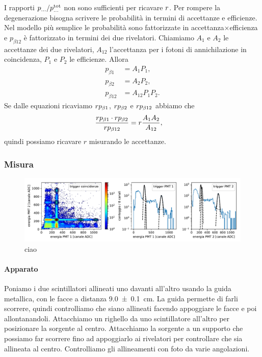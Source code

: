 I rapporti $p_{\dots} / p_{\dots}^\text{tot}$ non sono sufficienti per ricavare $r$.
Per rompere la degenerazione bisogna scrivere le probabilità in termini di accettanze e efficienze.
Nel modello più semplice le probabilità sono fattorizzate in accettanza$\times$efficienza
e $p_{\beta12}$ è fattorizzato in termini dei due rivelatori.
Chiamiamo $A_1$ e $A_2$ le accettanze dei due rivelatori,
$A_{12}$ l'accettanza per i fotoni di annichilazione in coincidenza,
$P_1$ e $P_2$ le efficienze.
Allora
\begin{align*}
	p_{\beta1}
	&= A_1 P_1, \\
	p_{\beta2}
	&= A_2 P_2, \\
	p_{\beta12}
	&= A_{12} P_1 P_2.
\end{align*}
Se dalle equazioni ricaviamo $r p_{\beta1}$, $r p_{\beta2}$ e $r p_{\beta12}$ abbiamo che
\begin{align*}
	\frac {r p_{\beta1} \cdot r p_{\beta2}} {r p_{\beta12}}
	&= r \frac{A_1 A_2}{A_{12}},
\end{align*}
quindi possiamo ricavare $r$ misurando le accettanze.

\subsubsection{Misura}

\begin{figure}
	\hspace{-0.25\textwidth}
	\includegraphics[width=1.5\textwidth]{immagini/ec}
	\caption{\label{fig:ec}
	ciao}
\end{figure}

\paragraph{Apparato}

Poniamo i due scintillatori allineati uno davanti all'altro usando la guida metallica,
con le facce a distanza \SI{9.0 \pm 0.1}{cm}.
La guida permette di farli scorrere, quindi controlliamo che siano allineati
facendo appoggiare le facce e poi allontanandoli.
Attacchiamo un righello da uno scintillatore all'altro per posizionare la sorgente al centro.
Attacchiamo la sorgente a un supporto che possiamo far scorrere fino ad appoggiarlo ai rivelatori
per controllare che sia allineata al centro.
Controlliamo gli allineamenti con foto da varie angolazioni.

